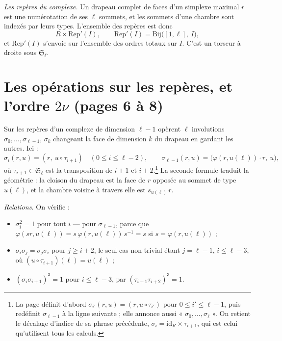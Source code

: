 \documentclass[11pt,a4paper]{article}
\begin{document}
\emph{Les repères du complexe.} Un drapeau complet de faces d'un simplexe
maximal $r$ est une numérotation de ses $\ell$ sommets, et les sommets d'une
chambre sont indexés par leurs types. L'ensemble des repères est donc
\[
  R \times \mathrm{Rep}'(I),
  \qquad
  \mathrm{Rep}'(I) = \mathrm{Bij}\bigl([1, \ell],\ I\bigr),
\]
et $\mathrm{Rep}'(I)$ s'envoie sur l'ensemble des ordres totaux sur $I$.
C'est un torseur à droite sous $\mathfrak{S}_{\ell}$.

\section*{Les opérations sur les repères, et l'ordre $2\nu$ (pages 6 à 8)}

Sur les repères d'un complexe de dimension $\ell - 1$ opèrent $\ell$
involutions $\sigma_{0}, \ldots, \sigma_{\ell-1}$, $\sigma_{k}$ changeant la
face de dimension $k$ du drapeau en gardant les autres. Ici :
\[
  \sigma_{i}(r, u) = (r,\ u \circ \tau_{i+1}) \quad (0 \leq i \leq \ell - 2),
  \qquad
  \sigma_{\ell-1}(r, u) = \bigl(\varphi(r, u(\ell)) \cdot r,\ u\bigr),
\]
où $\tau_{i+1} \in \mathfrak{S}_{\ell}$ est la transposition de $i+1$ et
$i+2$.\footnote{La page définit d'abord
$\sigma_{i'}(r, u) = (r, u \circ \tau_{i'})$ pour $0 \leq i' \leq \ell - 1$,
puis redéfinit $\sigma_{\ell-1}$ à la ligne suivante ; elle annonce aussi
« $\sigma_{0}, \ldots, \sigma_{\ell}$ ». On retient le décalage d'indice de sa
phrase précédente, $\sigma_{i} = \mathrm{id}_{R} \times \tau_{i+1}$, qui est
celui qu'utilisent tous les calculs.} La seconde formule traduit la
géométrie : la cloison du drapeau est la face de $r$ opposée au sommet de type
$u(\ell)$, et la chambre voisine à travers elle est $s_{u(\ell)}\,r$.

\emph{Relations.} On vérifie :
\begin{itemize}
\item $\sigma_{i}^{2} = 1$ pour tout $i$ --- pour $\sigma_{\ell-1}$, parce que
$\varphi(sr, u(\ell)) = s\,\varphi(r,u(\ell))\,s^{-1} = s$ si
$s = \varphi(r, u(\ell))$ ;
\item $\sigma_{i}\sigma_{j} = \sigma_{j}\sigma_{i}$ pour $j \geq i + 2$, le seul
cas non trivial étant $j = \ell - 1$, $i \leq \ell - 3$, où
$(u \circ \tau_{i+1})(\ell) = u(\ell)$ ;
\item $(\sigma_{i}\sigma_{i+1})^{3} = 1$ pour $i \leq \ell - 3$, par
$(\tau_{i+1}\tau_{i+2})^{3} = 1$.
\end{itemize}
\end{document}
